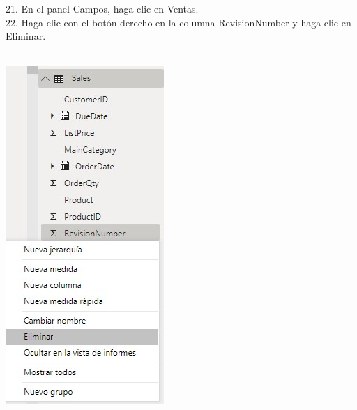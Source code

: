 \documentclass[12pt,letterpaper]{article}
\begin{document}
\begin{flushleft}
\begin{itemize}
21. En el panel Campos, haga clic en Ventas.\\
22. Haga clic con el botón derecho en la columna RevisionNumber y haga clic en Eliminar.\\
\textbf{ }\\
\begin{center}
	\includegraphics[width=6cm]{./Imagenes/image18} 
	\end{center}
\textbf{ }\\


\end{itemize}
\end{flushleft}
\end{document}
